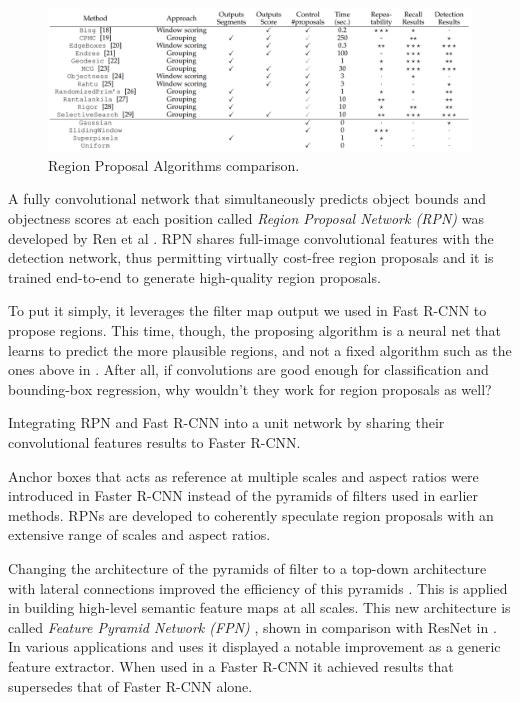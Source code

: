 \begin{figure}[H]
	\centering
	\includegraphics[scale=0.5]{images/table.PNG}
	\caption{Region Proposal Algorithms comparison.}
	\label{f:table}
\end{figure}

A fully convolutional network that simultaneously predicts object bounds and objectness scores at each position called \emph{ Region Proposal Network (RPN) }was developed by Ren et al \cite{ren2015faster}. RPN shares full-image convolutional features with the detection network, thus permitting virtually cost-free region proposals and it is trained end-to-end to generate high-quality region proposals.

To put it simply, it leverages the filter map output we used in Fast R-CNN to propose regions. This time, though, the proposing algorithm is a neural net that learns to predict the more plausible regions, and not a fixed algorithm such as the ones above in .
After all, if convolutions are good enough for classification and bounding-box regression, why wouldn't they work for region proposals as well?

Integrating RPN and Fast R-CNN into a unit network by sharing their convolutional features results to Faster R-CNN.


Anchor boxes that acts as reference at multiple scales and aspect ratios were introduced in Faster R-CNN instead of the pyramids of filters used in earlier methods. RPNs are developed to coherently speculate region proposals with an extensive range of scales and aspect ratios.

Changing the architecture of the pyramids of filter to a top-down architecture with lateral connections improved the efficiency of this pyramids \cite{lin2017feature}. This is applied in building high-level semantic feature maps at all scales. This new architecture is called \emph{ Feature Pyramid Network (FPN)} \cite{lin2017feature}, shown in comparison with ResNet in . In various applications and uses it displayed a notable improvement as a generic feature extractor. When used in a Faster R-CNN it achieved results that supersedes that of Faster R-CNN alone. 

